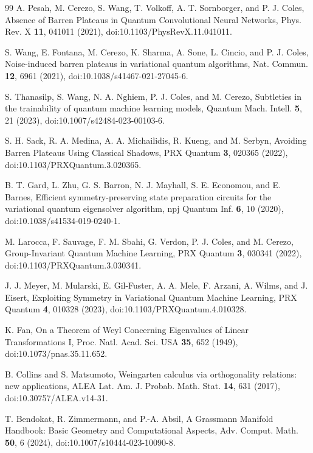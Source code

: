 \documentclass[aps,pra,reprint,superscriptaddress,nofootinbib,longbibliography]{revtex4-2}
\begin{document}
\begin{thebibliography}{99}
A. Pesah, M. Cerezo, S. Wang, T. Volkoff, A. T. Sornborger, and P. J. Coles,
Absence of Barren Plateaus in Quantum Convolutional Neural Networks,
Phys. Rev. X \textbf{11}, 041011 (2021),
doi:10.1103/PhysRevX.11.041011.

S. Wang, E. Fontana, M. Cerezo, K. Sharma, A. Sone, L. Cincio, and P. J. Coles,
Noise-induced barren plateaus in variational quantum algorithms,
Nat. Commun. \textbf{12}, 6961 (2021),
doi:10.1038/s41467-021-27045-6.

S. Thanasilp, S. Wang, N. A. Nghiem, P. J. Coles, and M. Cerezo,
Subtleties in the trainability of quantum machine learning models,
Quantum Mach. Intell. \textbf{5}, 21 (2023),
doi:10.1007/s42484-023-00103-6.

S. H. Sack, R. A. Medina, A. A. Michailidis, R. Kueng, and M. Serbyn,
Avoiding Barren Plateaus Using Classical Shadows,
PRX Quantum \textbf{3}, 020365 (2022),
doi:10.1103/PRXQuantum.3.020365.

B. T. Gard, L. Zhu, G. S. Barron, N. J. Mayhall, S. E. Economou, and E. Barnes,
Efficient symmetry-preserving state preparation circuits for the variational quantum eigensolver algorithm,
npj Quantum Inf. \textbf{6}, 10 (2020),
doi:10.1038/s41534-019-0240-1.

M. Larocca, F. Sauvage, F. M. Sbahi, G. Verdon, P. J. Coles, and M. Cerezo,
Group-Invariant Quantum Machine Learning,
PRX Quantum \textbf{3}, 030341 (2022),
doi:10.1103/PRXQuantum.3.030341.

J. J. Meyer, M. Mularski, E. Gil-Fuster, A. A. Mele, F. Arzani, A. Wilms, and J. Eisert,
Exploiting Symmetry in Variational Quantum Machine Learning,
PRX Quantum \textbf{4}, 010328 (2023),
doi:10.1103/PRXQuantum.4.010328.

K. Fan,
On a Theorem of Weyl Concerning Eigenvalues of Linear Transformations I,
Proc. Natl. Acad. Sci. USA \textbf{35}, 652 (1949),
doi:10.1073/pnas.35.11.652.

B. Collins and S. Matsumoto,
Weingarten calculus via orthogonality relations: new applications,
ALEA Lat. Am. J. Probab. Math. Stat. \textbf{14}, 631 (2017),
doi:10.30757/ALEA.v14-31.

T. Bendokat, R. Zimmermann, and P.-A. Absil,
A Grassmann Manifold Handbook: Basic Geometry and Computational Aspects,
Adv. Comput. Math. \textbf{50}, 6 (2024),
doi:10.1007/s10444-023-10090-8.



\end{thebibliography}
\end{document}
